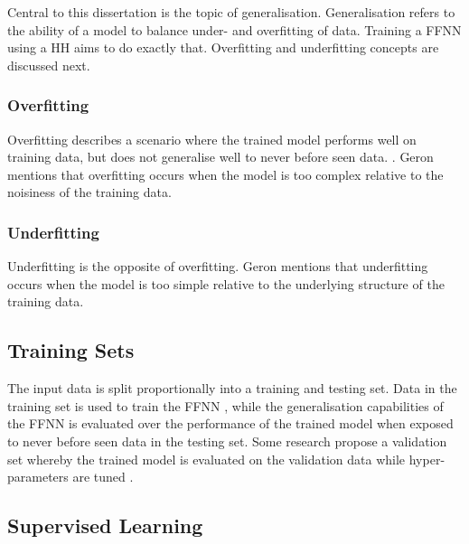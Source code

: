 Central to this dissertation is the topic of generalisation. Generalisation refers to
the ability of a model to balance under- and overfitting of data. Training a
\ac{FFNN} using a \ac{HH} aims to do exactly that. Overfitting and underfitting
concepts are discussed next.

\subsubsection{Overfitting}
\label{sec:anns:training:overfitting}

Overfitting describes a scenario where the trained model
performs well on training data, but does not generalise well to never before
seen data. \cite{ref:tetko:1995, ref:geron:2017}. Geron \cite{ref:geron:2017}
mentions that overfitting occurs when the model is too
complex relative to the noisiness of the training data.


\subsubsection{Underfitting}
\label{sec:anns:training:generalisation_capabilities:underfitting}

Underfitting is the opposite of
overfitting. Geron \cite{ref:geron:2017} mentions that
underfitting occurs when the model is too simple relative to
the underlying structure of the training data.


\subsection{Training Sets}
\label{sec:anns:training:sets}

The input data is split proportionally into a training and testing set. Data in
the training set is used to train the \ac{FFNN} \cite{ref:james:2013}, while the
generalisation capabilities of the \ac{FFNN} is evaluated over the performance
of the trained model when exposed to never before seen data in the testing set.
Some research propose a validation set whereby the trained model is evaluated on
the validation data while hyper-parameters are tuned \cite{ref:brownlee:2017}.


\subsection{Supervised Learning}
\label{sec:anns:training:supervised_learning}

